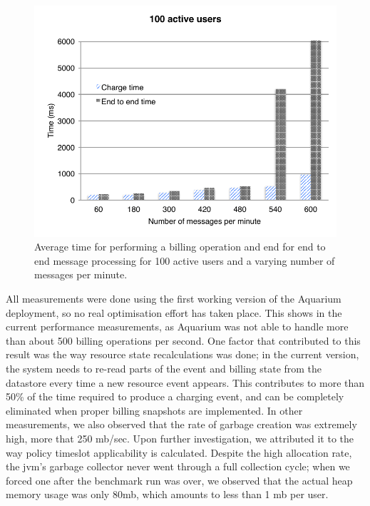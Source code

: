 \documentclass[letterpaper,twocolumn,10pt]{article}
\begin{document}
\begin{figure}[t]
    \begin{center}
        \includegraphics[scale=0.59]{perf.pdf}
    \end{center}

    \caption{Average time for performing a billing operation and end
      for end to end message processing for 100 active users and a
      varying number of messages per minute.}
    
    \label{fig:perf}
\end{figure}

All measurements were done using the first working version of the Aquarium
deployment, so no real optimisation effort has taken place. This shows in the
current performance measurements, as Aquarium was not able to handle more than
about 500 billing operations per second. One factor that contributed to this
result was the way resource state recalculations was done; in the current
version, the system needs to re-read parts of the event and billing state from
the datastore every time a new resource event appears. This contributes to more
than 50\% of the time required to produce a charging event, and can be
completely eliminated when proper billing snapshots are implemented. In other
measurements, we also observed that the rate of garbage creation was extremely
high, more that 250 {\sc mb}/sec. Upon further investigation, we attributed it
to the way policy timeslot applicability is calculated. Despite the high
allocation rate, the {\sc jvm}'s garbage collector never went through a
full collection cycle; when we forced one after the benchmark run was over, 
we observed that the actual heap memory usage was only 80{\sc mb}, which
amounts to less than 1 {\sc mb} per user.
\end{document}
